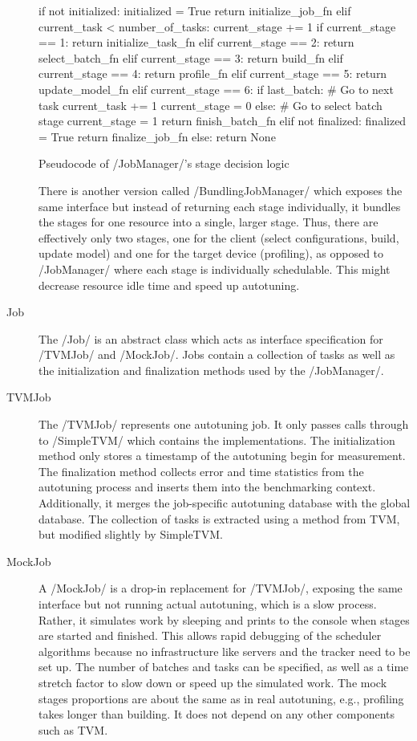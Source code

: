 \begin{description}
\begin{listing}[h]
\begin{pythoncode}
if not initialized:
    initialized = True
    return initialize_job_fn
elif current_task < number_of_tasks:
    current_stage += 1
    if   current_stage == 1: return initialize_task_fn
    elif current_stage == 2: return select_batch_fn
    elif current_stage == 3: return build_fn
    elif current_stage == 4: return profile_fn
    elif current_stage == 5: return update_model_fn
    elif current_stage == 6:
        if last_batch:
            # Go to next task
            current_task += 1
            current_stage = 0
        else:
            # Go to select batch stage
            current_stage = 1
        return finish_batch_fn
elif not finalized:
    finalized = True
    return finalize_job_fn
else: return None
\end{pythoncode}
\unskip
\caption[{Pseudocode of JobManager's stage decision logic}]{Pseudocode of \pythoninline/JobManager/'s stage decision logic}
\label{lst:stage-decision-algo}
\end{listing}
	There is another version called \pythoninline/BundlingJobManager/ which exposes the same interface but instead of returning each stage individually, it bundles the stages for one resource into a single, larger stage. Thus, there are effectively only two stages, one for the client (select configurations, build, update model) and one for the target device (profiling), as opposed to \pythoninline/JobManager/ where each stage is individually schedulable. This might decrease resource idle time and speed up autotuning.
	\item[Job] The \pythoninline/Job/ is an abstract class which acts as interface specification for \pythoninline/TVMJob/ and \pythoninline/MockJob/. Jobs contain a collection of tasks as well as the initialization and finalization methods used by the \pythoninline/JobManager/.
	\item[TVMJob] The \pythoninline/TVMJob/ represents one autotuning job. It only passes calls through to \pythoninline/SimpleTVM/ which contains the implementations. The initialization method only stores a timestamp of the autotuning begin for measurement. The finalization method collects error and time statistics from the autotuning process and inserts them into the benchmarking context. Additionally, it merges the job-specific autotuning database with the global database. The collection of tasks is extracted using a method from TVM, but modified slightly by SimpleTVM.
	\item[MockJob] A \pythoninline/MockJob/ is a drop-in replacement for \pythoninline/TVMJob/, exposing the same interface but not running actual autotuning, which is a slow process. Rather, it simulates work by sleeping and prints to the console when stages are started and finished. This allows rapid debugging of the scheduler algorithms because no infrastructure like servers and the tracker need to be set up. The number of batches and tasks can be specified, as well as a time stretch factor to slow down or speed up the simulated work. The mock stages proportions are about the same as in real autotuning, e.g., profiling takes longer than building. It does not depend on any other components such as TVM.
\end{description}

